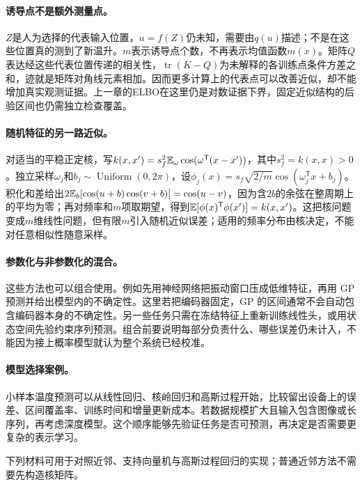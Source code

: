 \paragraph{诱导点不是额外测量点。}
$Z$是人为选择的代表输入位置，$u=f(Z)$仍未知，需要由$q(u)$描述；不是在这些位置真的测到了新温升。$m$表示诱导点个数，不再表示均值函数$m(x)$。矩阵$Q$表达经这些代表位置传递的相关性，$\operatorname{tr}(K-Q)$为未解释的各训练点条件方差之和，迹就是矩阵对角线元素相加。因而更多计算上的代表点可以改善近似，却不能增加真实观测证据。上一章的ELBO在这里仍是对数证据下界，固定近似结构的后验区间也仍需独立检查覆盖。

\paragraph{随机特征的另一路近似。}
对适当的平稳正定核，写$k(x,x')=s_f^2\mathbb{E}_\omega\cos(\omega^{\mathsf T}(x-x'))$，其中$s_f^2=k(x,x)>0$。独立采样$\omega_j$和$b_j\sim\operatorname{Uniform}(0,2\pi)$，设$\phi_j(x)=s_f\sqrt{2/m}\cos(\omega_j^{\mathsf T}x+b_j)$。积化和差给出$2\mathbb{E}_b[\cos(u+b)\cos(v+b)]=\cos(u-v)$，因为含$2b$的余弦在整周期上的平均为零；再对频率和$m$项取期望，得到$\mathbb{E}[\phi(x)^{\mathsf T}\phi(x')]=k(x,x')$。这把核问题变成$m$维线性问题，但有限$m$引入随机近似误差；适用的频率分布由核决定，不能对任意相似性随意采样。

\paragraph{参数化与非参数化的混合。}
这些方法也可以组合使用。例如先用神经网络把振动窗口压成低维特征，再用 GP 预测并给出模型内的不确定性。这里若把编码器固定，GP 的区间通常不会自动包含编码器本身的不确定性。另一些任务只需在冻结特征上重新训练线性头，或用状态空间先验约束序列预测。组合前要说明每部分负责什么、哪些误差仍未计入，不能因为接上概率模型就认为整个系统已经校准。

\paragraph{模型选择案例。}
小样本温度预测可以从线性回归、核岭回归和高斯过程开始，比较留出设备上的误差、区间覆盖率、训练时间和增量更新成本。若数据规模扩大且输入包含图像或长序列，再考虑深度模型。这个顺序能够先验证任务是否可预测，再决定是否需要更复杂的表示学习。

下列材料可用于对照近邻、支持向量机与高斯过程回归的实现；普通近邻方法不需要先构造核矩阵。
